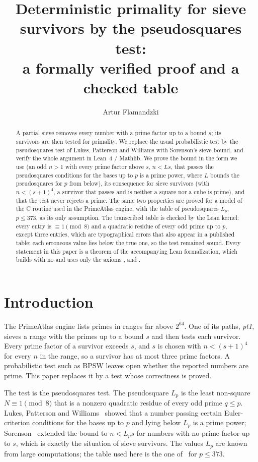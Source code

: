 \documentclass[11pt]{amsart}
\title[Pseudosquares primality: a verified proof]{Deterministic primality for sieve survivors by the pseudosquares test:\\
a formally verified proof and a checked table}
\author{Artur Flamandzki}
\date{}
\newcommand{\lean}[1]{\texttt{\detokenize{#1}}}
\theoremstyle{definition}
\begin{document}
\begin{abstract}
A partial sieve removes every number with a prime factor up to a bound $s$; its survivors are
then tested for primality. We replace the usual probabilistic test by the pseudosquares test
of Lukes, Patterson and Williams with Sorenson's sieve bound, and verify the whole argument in
Lean~4 / Mathlib. We prove the bound in the form we use (an odd $n > 1$ with every prime factor
above $s$, $n < L s$, that passes the pseudosquares conditions for the bases up to $p$ is a
prime power, where $L$ bounds the pseudosquares for $p$ from below), its consequence for sieve
survivors (with $n < (s+1)^4$, a survivor that passes and is neither a square nor a cube is
prime), and that the test never rejects a prime. The same two properties are proved for a model
of the C routine used in the PrimeAtlas engine, with the table of pseudosquares $L_p$,
$p \le 373$, as its only assumption. The transcribed table is checked by the Lean kernel:
every entry is $\equiv 1 \pmod 8$ and a quadratic residue of every odd prime up to $p$, except
three entries, which are typographical errors that also appear in a published table; each erroneous value lies
below the true one, so the test remained sound. Every statement in this paper is a theorem of
the accompanying Lean formalization, which builds with no \lean{sorry} and uses only the axioms
\lean{propext}, \lean{Quot.sound} and \lean{Classical.choice}.
\end{abstract}

\maketitle

\section{Introduction}

The PrimeAtlas engine lists primes in ranges far above $2^{64}$. One of its paths, \emph{pt1},
sieves a range with the primes up to a bound $s$ and then tests each survivor. Every prime factor
of a survivor exceeds $s$, and $s$ is chosen with $n < (s+1)^4$ for every $n$ in the range, so a
survivor has at most three prime factors. A probabilistic test such as BPSW leaves open whether
the reported numbers are prime. This paper replaces it by a test whose correctness is proved.

The test is the pseudosquares test. The pseudosquare $L_p$ is the least non-square
$N \equiv 1 \pmod 8$ that is a nonzero quadratic residue of every odd prime $q \le p$. Lukes,
Patterson and Williams~\cite{lpw} showed that a number passing certain Euler-criterion conditions
for the bases up to $p$ and lying below $L_p$ is a prime power; Sorenson~\cite{sorenson2006}
extended the bound to $n < L_p s$ for numbers with no prime factor up to $s$, which is exactly the
situation of sieve survivors. The values $L_p$ are known from large computations; the table used
here is the one of~\cite{sorenson2010} for $p \le 373$.
\end{document}
